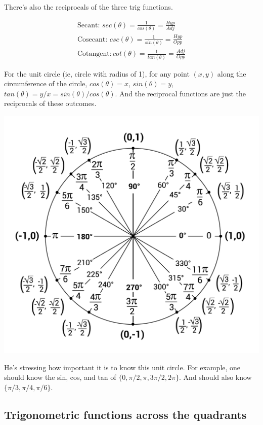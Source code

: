 \documentclass{article}
\begin{document}
There's also the reciprocals of the three trig functions. 

\begin{align*}
    \text{Secant: } sec(\theta) = \frac{1}{cos(\theta)} = \frac{Hyp}{Adj}\\
    \text{Cosecant: } csc(\theta) = \frac{1}{sin(\theta)} = \frac{Hyp}{Opp}\\
    \text{Cotangent}: cot(\theta) = \frac{1}{tan(\theta)} = \frac{Adj}{Opp}
\end{align*}

For the unit circle (ie, circle with radius of 1), for any point $(x, y)$ along the
circumference of the circle, $cos(\theta)=x$, $sin(\theta) = y$, $tan(\theta) = y/x =
sin(\theta) / cos(\theta)$. And the reciprocal functions are just the reciprocals of these
outcomes.

\begin{center}
\includegraphics[scale=0.1]{Unit-circle.png}
\end{center}

He's stressing how important it is to know this unit circle. For example, one should know
the sin, cos, and tan of $\{0, \pi/2, \pi, 3\pi/2, 2\pi\}$. And should also know $\{\pi/3,
\pi/4, \pi/6\}$.

\subsection{Trigonometric functions across the quadrants}
\end{document}
